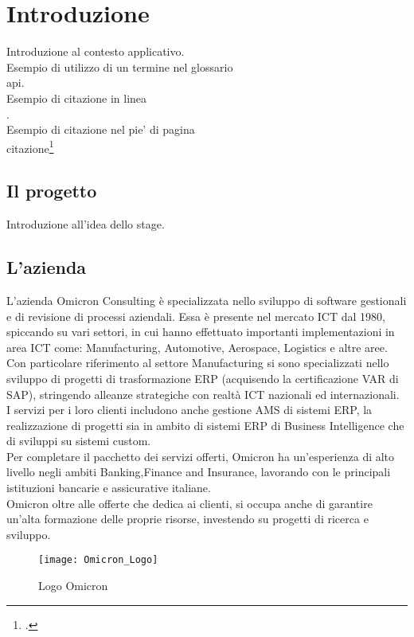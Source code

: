 \chapter{Introduzione}
\label{cap:introduzione}

Introduzione al contesto applicativo.\\

\noindent Esempio di utilizzo di un termine nel glossario \\
\gls{api}. \\

\noindent Esempio di citazione in linea \\
\cite{site:agile-manifesto}. \\

\noindent Esempio di citazione nel pie' di pagina \\
citazione\footcite{womak:lean-thinking} \\

\section{Il progetto}

Introduzione all'idea dello stage.

\section{L'azienda}

L’azienda Omicron Consulting è specializzata nello sviluppo di software gestionali e di revisione di processi aziendali. Essa è presente nel mercato ICT dal 1980, spiccando su vari settori, in cui hanno effettuato importanti implementazioni in area ICT come: Manufacturing, Automotive, Aerospace, Logistics e altre aree.
Con particolare riferimento al settore Manufacturing si sono specializzati nello sviluppo di progetti di trasformazione ERP (acquisendo la certificazione VAR di SAP), stringendo alleanze strategiche con realtà ICT nazionali ed internazionali.\\
I servizi per i loro clienti includono anche gestione AMS di sistemi ERP, la realizzazione di progetti sia in ambito di sistemi ERP di Business Intelligence che di sviluppi su sistemi custom.\\
Per completare il pacchetto dei servizi offerti, Omicron ha un’esperienza di alto livello negli ambiti Banking,Finance and Insurance, lavorando con le principali istituzioni bancarie e assicurative italiane.\\
Omicron oltre alle offerte che dedica ai clienti, si occupa anche di garantire un’alta formazione delle proprie risorse, investendo su progetti di ricerca e sviluppo.
\begin{figure}[!h] 
    \centering 
    \texttt{[image: Omicron\_Logo]} 
    \caption{Logo Omicron}
\end{figure}


